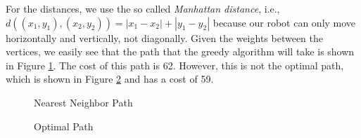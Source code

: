 For the distances, we use the so called \textit{Manhattan distance}, i.e.,\ \\ $d((x_1,y_1),(x_2,y_2)) = |x_1 - x_2| +| y_1 - y_2|$ because our robot can only move horizontally and vertically, not diagonally. Given the weights between the vertices, we easily see that the path that the greedy algorithm will take is shown in Figure \ref{fig:pathOnComplete}. The cost of this path is 62. However, this is not the optimal path, which is shown in Figure \ref{fig:optcompleteGraph} and has a cost of 59.

\begin{figure}
\centering
{}
\caption{Nearest Neighbor Path}
\label{fig:pathOnComplete}
\end{figure}


\begin{figure}
\centering
{}
\caption{Optimal Path}
\label{fig:optcompleteGraph}
\end{figure}


